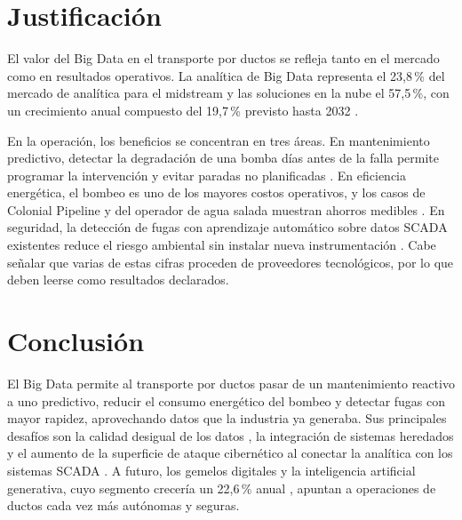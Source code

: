 \documentclass[conference]{IEEEtran}
\begin{document}
\section{Justificación}
El valor del Big Data en el transporte por ductos se refleja tanto en el mercado como en resultados operativos. La analítica de Big Data representa el 23,8\,\% del mercado de analítica para el midstream y las soluciones en la nube el 57,5\,\%, con un crecimiento anual compuesto del 19,7\,\% previsto hasta 2032 \cite{mordor}.

En la operación, los beneficios se concentran en tres áreas. En mantenimiento predictivo, detectar la degradación de una bomba días antes de la falla permite programar la intervención y evitar paradas no planificadas \cite{eni}. En eficiencia energética, el bombeo es uno de los mayores costos operativos, y los casos de Colonial Pipeline y del operador de agua salada muestran ahorros medibles \cite{colonial, neuralix}. En seguridad, la detección de fugas con aprendizaje automático sobre datos SCADA existentes reduce el riesgo ambiental sin instalar nueva instrumentación \cite{flowstate}. Cabe señalar que varias de estas cifras proceden de proveedores tecnológicos, por lo que deben leerse como resultados declarados.

\section{Conclusión}
El Big Data permite al transporte por ductos pasar de un mantenimiento reactivo a uno predictivo, reducir el consumo energético del bombeo y detectar fugas con mayor rapidez, aprovechando datos que la industria ya generaba. Sus principales desafíos son la calidad desigual de los datos \cite{ogj}, la integración de sistemas heredados y el aumento de la superficie de ataque cibernético al conectar la analítica con los sistemas SCADA \cite{mordor}. A futuro, los gemelos digitales y la inteligencia artificial generativa, cuyo segmento crecería un 22,6\,\% anual \cite{mordor}, apuntan a operaciones de ductos cada vez más autónomas y seguras.
\end{document}
